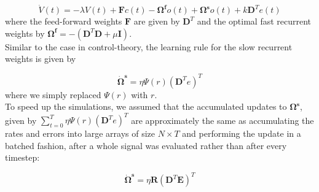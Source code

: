 \documentclass[twoside,11pt,titlepage]{article}
\begin{document}
\begin{equation*}
  \dot{V}(t) = -\lambda V(t) + \mathbf{F}c(t) - \mathbf{\Omega^f}o(t) + \mathbf{\Omega^s}o(t) + k\mathbf{D}^Te(t)
\end{equation*}
where the feed-forward weights $\mathbf{F}$ are given by $\mathbf{D}^T$ and the optimal fast recurrent weights by $\mathbf{\Omega^f}=-(\mathbf{D}^T\mathbf{D} + \mu\mathbf{I})$. \\
Similar to the case in control-theory, the learning rule for the slow recurrent weights is given by

\begin{equation*}
  \dot{\mathbf{\Omega}}^\mathbf{s} = \eta \Psi(r)(\mathbf{D}^Te)^T
\end{equation*}
where we simply replaced $\Psi(r)$ with $r$. \\
To speed up the simulations, we assumed that the accumulated updates to $\mathbf{\Omega^s}$, given by $\sum_{t=0}^{T}{\eta \Psi(r)(\mathbf{D}^Te)^T}$ are approximately the same as
accumulating the rates and errors into large arrays of size $N \times T$ and performing the update in a batched fashion, after a whole signal was evaluated rather than after every timestep:

\begin{equation*}
  \dot{\mathbf{\Omega}}^\mathbf{s} = \eta \mathbf{R}(\mathbf{D}^T\mathbf{E})^T
\end{equation*}
\end{document}
